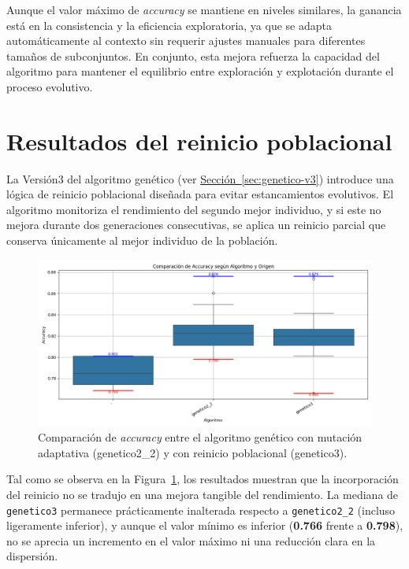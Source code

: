Aunque el valor máximo de \textit{accuracy} se mantiene en niveles similares, la ganancia está en la consistencia y la eficiencia exploratoria,
ya que se adapta automáticamente al contexto sin requerir ajustes manuales para diferentes tamaños de subconjuntos.
En conjunto, esta mejora refuerza la capacidad del algoritmo para mantener el equilibrio entre exploración y explotación durante el proceso evolutivo.


\section{Resultados del reinicio poblacional}\label{sec:resultados-reinicio-poblacional}
La Versión3 del algoritmo genético (ver \hyperref[sec:genetico-v3]{Sección~\ref*{sec:genetico-v3}})
introduce una lógica de reinicio poblacional diseñada para evitar estancamientos evolutivos.
El algoritmo monitoriza el rendimiento del segundo mejor individuo, y si este no mejora durante dos generaciones consecutivas,
se aplica un reinicio parcial que conserva únicamente al mejor individuo de la población.

\begin{figure}[htp]
    \centering
    \includegraphics[width=1\textwidth]{imagenes/evaluaciones/reinicio-poblacional}
    \caption{Comparación de \textit{accuracy} entre el algoritmo genético con mutación adaptativa (genetico2\_2) y con reinicio poblacional (genetico3).}
    \label{fig:reinicio_poblacional}
\end{figure}

Tal como se observa en la Figura~\ref{fig:reinicio_poblacional}, los resultados muestran que la incorporación del reinicio no se tradujo en una mejora tangible del rendimiento.
La mediana de \texttt{genetico3} permanece prácticamente inalterada respecto a \texttt{genetico2\_2} (incluso ligeramente inferior),
y aunque el valor mínimo es inferior (\textbf{0.766} frente a \textbf{0.798}), no se aprecia un incremento en el valor máximo ni una reducción clara en la dispersión.

